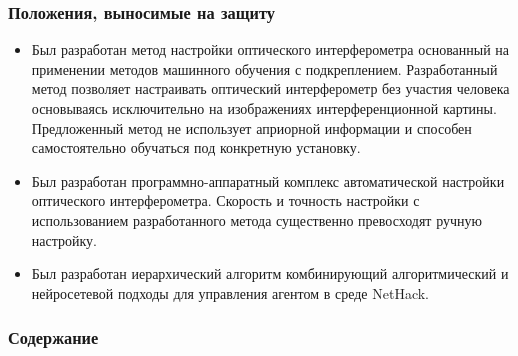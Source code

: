 \begin{frame}
    \setcounter{framenumber}{1}
    \maketitle
\end{frame}

\begin{frame}
    \frametitle{Положения, выносимые на защиту}
    \begin{itemize}
        \item Был разработан метод настройки оптического интерферометра основанный на применении методов машинного обучения с подкреплением. Разработанный метод позволяет настраивать оптический интерферометр без участия человека основываясь исключительно на изображениях интерференционной картины. Предложенный метод не использует априорной информации и способен самостоятельно обучаться под конкретную установку.
        \item Был разработан программно-аппаратный комплекс автоматической настройки оптического интерферометра. Скорость и точность настройки с использованием разработанного метода существенно превосходят ручную настройку.
        \item Был разработан иерархический алгоритм комбинирующий алгоритмический и нейросетевой подходы для управления агентом в среде NetHack.
    \end{itemize}
\end{frame}
\begin{frame}
    \frametitle{Содержание}
    \tableofcontents
\end{frame}
